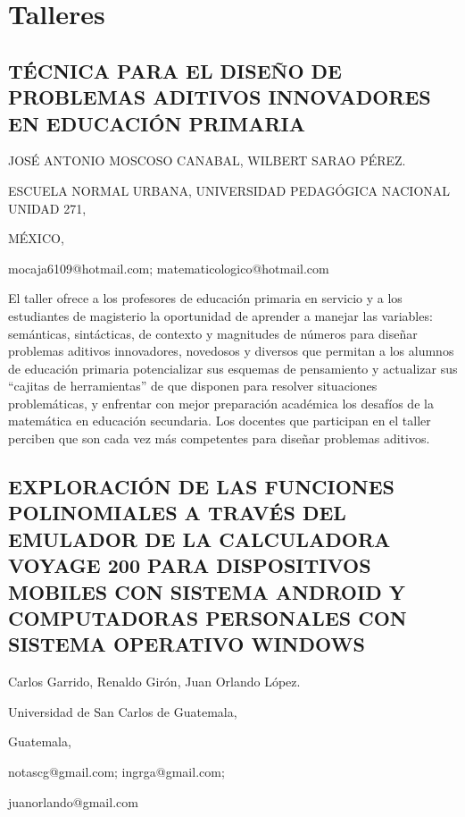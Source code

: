 
\pagestyle{headings}
\nocite{*}
\fontsize{7}{8}\selectfont
\pagecolor{white} 

\onecolumn
\chapter{Talleres } 
\renewcommand\thesection{TA\ \nplpadding{3}\numprint{\arabic{section}}} 
\setcounter{section}{0}
\chaptertoc
\twocolumn
\balance


\setcounter{section}{1}


\section{TÉCNICA PARA EL DISEÑO DE PROBLEMAS ADITIVOS INNOVADORES EN EDUCACIÓN
PRIMARIA}

\begin{datos}

JOSÉ ANTONIO MOSCOSO CANABAL, WILBERT SARAO PÉREZ.

ESCUELA NORMAL URBANA, UNIVERSIDAD PEDAGÓGICA NACIONAL UNIDAD 271,

MÉXICO,

mocaja6109@hotmail.com; matematicologico@hotmail.com

\end{datos}

El taller ofrece a los profesores de educación primaria en servicio
y a los estudiantes de magisterio la oportunidad de aprender a manejar
las variables: semánticas, sintácticas, de contexto y magnitudes de
números para diseñar problemas aditivos innovadores, novedosos y diversos
que permitan a los alumnos de educación primaria potencializar sus
esquemas de pensamiento y actualizar sus “cajitas de herramientas”
de que disponen para resolver situaciones problemáticas, y enfrentar
con mejor preparación académica los desafíos de la matemática en educación
secundaria. Los docentes que participan en el taller perciben que
son cada vez más competentes para diseñar problemas aditivos.


\section{EXPLORACIÓN DE LAS FUNCIONES POLINOMIALES A TRAVÉS DEL EMULADOR DE
LA CALCULADORA VOYAGE 200 PARA DISPOSITIVOS MOBILES CON SISTEMA ANDROID
Y COMPUTADORAS PERSONALES CON SISTEMA OPERATIVO WINDOWS}

\begin{datos}

Carlos Garrido, Renaldo Girón, Juan Orlando López.

Universidad de San Carlos de Guatemala,

Guatemala,

notascg@gmail.com; ingrga@gmail.com;

juanorlando@gmail.com

\end{datos}


